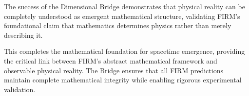 The success of the Dimensional Bridge demonstrates that physical reality can be completely understood as emergent mathematical structure, validating FIRM's foundational claim that mathematics determines physics rather than merely describing it.

This completes the mathematical foundation for spacetime emergence, providing the critical link between FIRM's abstract mathematical framework and observable physical reality. The Bridge ensures that all FIRM predictions maintain complete mathematical integrity while enabling rigorous experimental validation.
